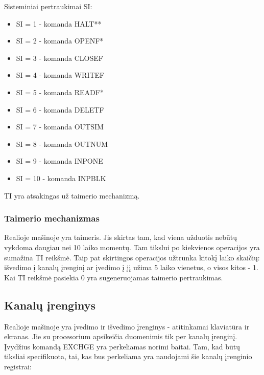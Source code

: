 \documentclass{VUMIFInfKursinis}
\begin{document}
Sisteminiai pertraukimai SI:
\begin{itemize}
	\item SI = 1 - komanda HALT**
	\item SI = 2 - komanda OPENF*
	\item SI = 3 - komanda CLOSEF
	\item SI = 4 - komanda WRITEF
	\item SI = 5 - komanda READF*
	\item SI = 6 - komanda DELETF
	\item SI = 7 - komanda OUTSIM
	\item SI = 8 - komanda OUTNUM
	\item SI = 9 - komanda INPONE		
	\item SI = 10 - komanda INPBLK		
\end{itemize}

TI yra atsakingas už taimerio mechanizmą.

\subsubsection{Taimerio mechanizmas}
Realioje mašinoje yra taimeris. Jis skirtas tam, kad viena užduotis nebūtų vykdoma daugiau nei 10 laiko momentų. Tam tikslui po kiekvienos operacijos yra sumažina TI reikšmė. Taip pat skirtingos operacijos užtrunka kitokį laiko skaičių: išvedimo į kanalų įrenginį ar įvedimo į jį užima 5 laiko vienetus, o visos kitos - 1. Kai TI reikšmė pasiekia 0 yra sugeneruojamas taimerio pertraukimas.

\subsection{Kanalų įrenginys}

Realioje mašinoje yra įvedimo ir išvedimo įrenginys - atitinkamai klaviatūra ir  ekranas. Jie su procesorium apsikeičia duomenimis tik per kanalų įrenginį. Įvydžius komandą EXCHGE yra perkeliamas norimi baitai. Tam, kad būtų tiksliai specifikuota, tai, kas bus perkeliama yra naudojami šie kanalų įrenginio registrai:
\end{document}
